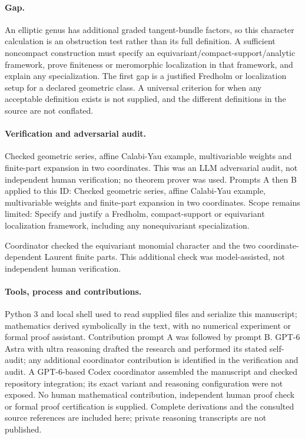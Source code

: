 \documentclass[11pt]{article}
\begin{document}
\paragraph{Gap.}An elliptic genus has additional graded tangent-bundle factors, so this character calculation is an obstruction test rather than its full definition. A sufficient noncompact construction must specify an equivariant/compact-support/analytic framework, prove finiteness or meromorphic localization in that framework, and explain any specialization. The first gap is a justified Fredholm or localization setup for a declared geometric class. A universal criterion for when any acceptable definition exists is not supplied, and the different definitions in the source are not conflated.

\paragraph{Verification and adversarial audit.}
Checked geometric series, affine Calabi-Yau example, multivariable weights and finite-part expansion in two coordinates. This was an LLM adversarial audit, not independent human verification; no theorem prover was used. Prompts A then B applied to this ID: Checked geometric series, affine Calabi-Yau example, multivariable weights and finite-part expansion in two coordinates. Scope remains limited: Specify and justify a Fredholm, compact-support or equivariant localization framework, including any nonequivariant specialization.

Coordinator checked the equivariant monomial character and the two coordinate-dependent Laurent finite parts. This additional check was model-assisted, not independent human verification.

\paragraph{Tools, process and contributions.}
Python 3 and local shell used to read supplied files and serialize this manuscript; mathematics derived symbolically in the text, with no numerical experiment or formal proof assistant. Contribution prompt A was followed by prompt B. GPT-6 Astra with ultra reasoning drafted the research and performed its stated self-audit; any additional coordinator contribution is identified in the verification and audit. A GPT-6-based Codex coordinator assembled the manuscript and checked repository integration; its exact variant and reasoning configuration were not exposed. No human mathematical contribution, independent human proof check or formal proof certification is supplied. Complete derivations and the consulted source references are included here; private reasoning transcripts are not published.
\end{document}
